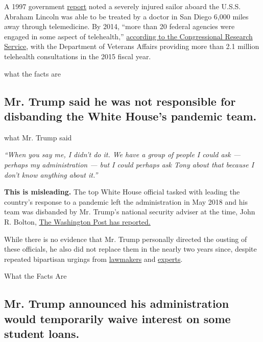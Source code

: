 A 1997 government
\href{https://www.gao.gov/archive/1997/ns9767.pdf}{report} noted a
severely injured sailor aboard the U.S.S. Abraham Lincoln was able to be
treated by a doctor in San Diego 6,000 miles away through telemedicine.
By 2014, ``more than 20 federal agencies were engaged in some aspect of
telehealth,''
\href{https://www.senate.gov/CRSpubs/757e3b90-ff10-497c-8e8c-ac1bdbdb3aaf.pdf}{according
to the Congressional Research Service}, with the Department of Veterans
Affairs providing more than 2.1 million telehealth consultations in the
2015 fiscal year.

what the facts are

\hypertarget{mr-trump-said-he-was-not-responsible-for-disbanding-the-white-houses-pandemic-team}{%
\subsection{Mr. Trump said he was not responsible for disbanding the
White House's pandemic
team.}\label{mr-trump-said-he-was-not-responsible-for-disbanding-the-white-houses-pandemic-team}}

what Mr. Trump said

\emph{``When you say me, I didn't do it. We have a group of people I
could ask --- perhaps my administration --- but I could perhaps ask Tony
about that because I don't know anything about it.''}

\textbf{This is misleading.} The top White House official tasked with
leading the country's response to a pandemic left the administration in
May 2018 and his team was disbanded by Mr. Trump's national security
adviser at the time, John R. Bolton,
\href{https://www.washingtonpost.com/news/to-your-health/wp/2018/05/10/top-white-house-official-in-charge-of-pandemic-response-exits-abruptly/}{The
Washington Post has reported.}

While there is no evidence that Mr. Trump personally directed the
ousting of these officials, he also did not replace them in the nearly
two years since, despite repeated bipartisan urgings from
\href{https://www.schatz.senate.gov/imo/media/doc/021320\%20NSC\%20Novel\%20Coronavirus\%20Letter\%20final\%20pdf.pdf}{lawmakers}
and
\href{https://csis-prod.s3.amazonaws.com/s3fs-public/publication/191122_EndingTheCycle_GHSC_WEB_FULL_11.22.pdf?utm_campaign=wp_the_health_202\&utm_medium=email\&utm_source=newsletter\&wpisrc=nl_health202\#page=31}{experts}.

What the Facts Are

\hypertarget{mr-trump-announced-his-administration-would-temporarily-waive-interest-on-some-student-loans}{%
\subsection{Mr. Trump announced his administration would temporarily
waive interest on some student
loans.}\label{mr-trump-announced-his-administration-would-temporarily-waive-interest-on-some-student-loans}}


